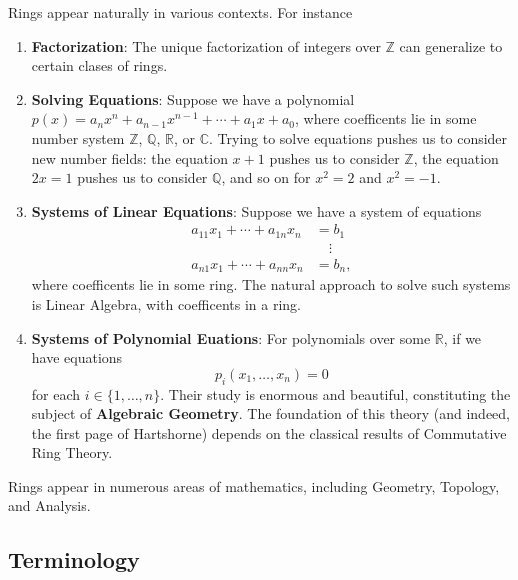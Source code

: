 \documentclass[11pt]{article}
\begin{document}
Rings appear naturally in various contexts. For instance
\begin{enumerate}
	\item \textbf{Factorization}: The unique factorization of integers over $\mathbb{Z}$ can generalize to certain clases of rings.
	\item \textbf{Solving Equations}: Suppose we have a polynomial $p(x) = a_{n}x^{n} + a_{n - 1}x^{n - 1} + \cdots + a_{1}x + a_{0}$, where coefficents lie in some number system $\mathbb{Z}$, $\mathbb{Q}$, $\mathbb{R}$, or $\mathbb{C}$. Trying to solve equations pushes us to consider new number fields: the equation $x + 1$ pushes us to consider $\mathbb{Z}$, the equation $2x = 1$ pushes us to consider $\mathbb{Q}$, and so on for $x^{2} = 2$ and $x^{2} = -1$.
	\item \textbf{Systems of Linear Equations}: Suppose we have a system of equations
	\begin{align*}
		a_{11} x_{1} + \cdots + a_{1n} x_{n} &= b_{1} \\
											 &\quad \vdots \\
		a_{n1} x_{1} + \cdots + a_{nn} x_{n} &= b_{n},
	\end{align*}
	where coefficents lie in some ring. The natural approach to solve such systems is Linear Algebra, with coefficents in a ring.
	\item \textbf{Systems of Polynomial Euations}: For polynomials over some $\mathbb{R}$, if we have equations 
	\[
		p_{i}(x_{1}, \ldots, x_{n}) = 0
	\]
	for each $i \in \{ 1, \ldots, n \}$. Their study is enormous and beautiful, constituting the subject of \textbf{Algebraic Geometry}. The foundation of this theory (and indeed, the first page of Hartshorne) depends on the classical results of Commutative Ring Theory.
\end{enumerate}

Rings appear in numerous areas of mathematics, including Geometry, Topology, and Analysis.


\subsection{Terminology}
\end{document}
